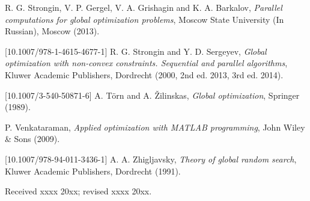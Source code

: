 \documentclass{aims}
\theoremstyle{definition}
\begin{document}
\begin{thebibliography}{10}
\newblock R. G. Strongin, V. P. Gergel, V. A. Grishagin and K. A. Barkalov,
\newblock \emph{Parallel computations for global optimization problems},
\newblock Moscow State University (In Russian), Moscow (2013).

[10.1007/978-1-4615-4677-1]
\newblock R. G. Strongin and Y. D. Sergeyev,
\newblock \emph{Global optimization with non-convex constraints. Sequential and parallel algorithms},
\newblock Kluwer Academic Publishers, Dordrecht (2000, 2nd ed. 2013, 3rd ed. 2014).

[10.1007/3-540-50871-6]
\newblock A. T\"orn and A. \v Zilinskas,
\newblock \emph{Global optimization},
\newblock Springer (1989).

\newblock P. Venkataraman,
\newblock \emph{Applied optimization with MATLAB programming},
\newblock John Wiley \& Sons (2009).

[10.1007/978-94-011-3436-1]
\newblock A. A. Zhigljavsky,
\newblock \emph{Theory of global random search},
\newblock Kluwer Academic Publishers, Dordrecht (1991).

\end{thebibliography}

\medskip
Received xxxx 20xx; revised xxxx 20xx.
\medskip
\end{document}
